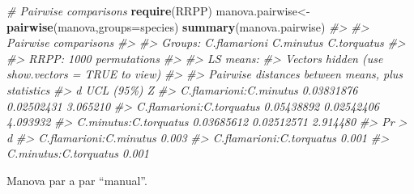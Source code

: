 \documentclass[
]{book}
\newenvironment{Shaded}{\begin{snugshade}}{\end{snugshade}}
\newcommand{\AttributeTok}[1]{\textcolor[rgb]{0.13,0.29,0.53}{#1}}
\newcommand{\CommentTok}[1]{\textcolor[rgb]{0.56,0.35,0.01}{\textit{#1}}}
\newcommand{\FunctionTok}[1]{\textcolor[rgb]{0.13,0.29,0.53}{\textbf{#1}}}
\newcommand{\NormalTok}[1]{#1}
\newcommand{\OtherTok}[1]{\textcolor[rgb]{0.56,0.35,0.01}{#1}}
\begin{document}
\begin{Shaded}
\begin{Highlighting}[]
\CommentTok{\# Pairwise comparisons}
\FunctionTok{require}\NormalTok{(RRPP)}
\NormalTok{manova.pairwise}\OtherTok{\textless{}{-}}\FunctionTok{pairwise}\NormalTok{(manova,}\AttributeTok{groups=}\NormalTok{species)}
\FunctionTok{summary}\NormalTok{(manova.pairwise)}
\CommentTok{\#\textgreater{} }
\CommentTok{\#\textgreater{} Pairwise comparisons}
\CommentTok{\#\textgreater{} }
\CommentTok{\#\textgreater{} Groups: C.flamarioni C.minutus C.torquatus }
\CommentTok{\#\textgreater{} }
\CommentTok{\#\textgreater{} RRPP: 1000 permutations}
\CommentTok{\#\textgreater{} }
\CommentTok{\#\textgreater{} LS means:}
\CommentTok{\#\textgreater{} Vectors hidden (use show.vectors = TRUE to view)}
\CommentTok{\#\textgreater{} }
\CommentTok{\#\textgreater{} Pairwise distances between means, plus statistics}
\CommentTok{\#\textgreater{}                                   d  UCL (95\%)        Z}
\CommentTok{\#\textgreater{} C.flamarioni:C.minutus   0.03831876 0.02502431 3.065210}
\CommentTok{\#\textgreater{} C.flamarioni:C.torquatus 0.05438892 0.02542406 4.093932}
\CommentTok{\#\textgreater{} C.minutus:C.torquatus    0.03685612 0.02512571 2.914480}
\CommentTok{\#\textgreater{}                          Pr \textgreater{} d}
\CommentTok{\#\textgreater{} C.flamarioni:C.minutus    0.003}
\CommentTok{\#\textgreater{} C.flamarioni:C.torquatus  0.001}
\CommentTok{\#\textgreater{} C.minutus:C.torquatus     0.001}
\end{Highlighting}
\end{Shaded}

Manova par a par ``manual''.
\end{document}
